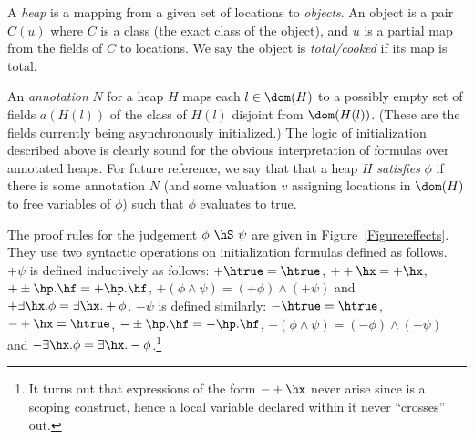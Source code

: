 A {\em heap} is a mapping from a given set of locations to {\em
  objects}. An object is a pair $C(u)$ where $C$ is a class (the exact
class of the object), and $u$ is a partial map from the fields of $C$
to locations. We say the object is {\em total/cooked} if its map is total.

An {\em annotation} $N$ for a heap $H$ maps each $l \in \dom(H)$ to a
possibly empty set of fields $a(H(l))$ of the class of $H(l)$ disjoint
from $\dom(H(l))$. (These are the fields currently being
asynchronously initialized.) The logic of initialization described
above is clearly sound for the obvious interpretation of formulas over
annotated heaps. For future reference, we say that that a heap $H$
{\em satisfies} $\phi$ if there is some annotation $N$ (and some
valuation $v$ assigning locations in $\dom(H)$ to free variables of
$\phi$) such that $\phi$ evaluates to true.

The proof rules for the judgement $\phi~\hS~\psi$ are given in
Figure~\ref{Figure:effects}. They use two syntactic operations on initialization
formulas defined as follows.
$+\psi$ is defined inductively as follows:
$+\htrue=\htrue$,
$++\hx=+\hx$,
$+\pm\hp.\hf=+\hp.\hf$,
$+(\phi \wedge\psi)=(+\phi)\wedge(+\psi)$
and $+\exists \hx.\phi=\exists \hx.+\phi$.
$-\psi$ is defined similarly:
$-\htrue=\htrue$,
$-+\hx=\htrue$,
$-\pm\hp.\hf=-\hp.\hf$,
$-(\phi \wedge\psi)=(-\phi)\wedge(-\psi)$
and $-\exists \hx.\phi=\exists \hx.-\phi$.\footnote{It turns out that
  expressions of the form $-+\hx$ never arise since \async{} is a
  scoping construct, hence a local variable declared within it never
  ``crosses'' out.}

